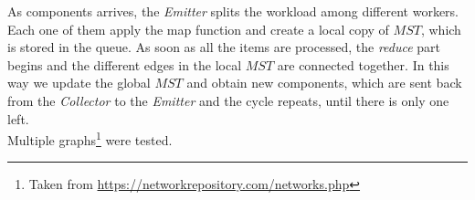 \documentclass[notitlepage]{article}
\begin{document}
As components arrives, the {\itshape Emitter} splits the workload among different workers. Each one of them apply the map function and create a local copy of $MST$, which is stored in the queue. As soon as 
all the items are processed, the {\itshape reduce} part begins and the different edges in the local $MST$ are connected together. In this way we update the global $MST$ and obtain new components, 
which are sent back from the {\itshape Collector} to the {\itshape Emitter} and the cycle repeats, until there is only one left.\\
Multiple graphs\footnote{Taken from \url{https://networkrepository.com/networks.php}} were tested.
\end{document}
